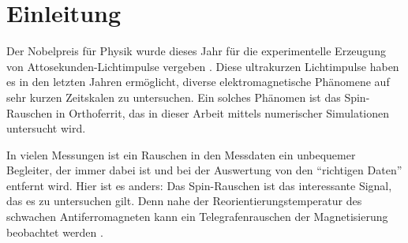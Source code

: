 \documentclass[main.tex]{subfiles}
\begin{document}
\section{Einleitung}

Der Nobelpreis für Physik wurde dieses Jahr für die experimentelle Erzeugung von Attosekunden-Lichtimpulse vergeben \cite{nobel-phy-2023}. Diese ultrakurzen Lichtimpulse haben es in den letzten Jahren ermöglicht, diverse elektromagnetische Phänomene auf sehr kurzen Zeitskalen zu untersuchen. Ein solches Phänomen ist das Spin-Rauschen in Orthoferrit, das in dieser Arbeit mittels numerischer Simulationen untersucht wird.

In vielen Messungen ist ein Rauschen in den Messdaten ein unbequemer Begleiter, der immer dabei ist und bei der Auswertung von den \enquote{richtigen Daten} entfernt wird. Hier ist es anders: Das Spin-Rauschen ist das interessante Signal, das es zu untersuchen gilt. Denn nahe der Reorientierungstemperatur des schwachen Antiferromagneten kann ein Telegrafenrauschen der Magnetisierung beobachtet werden \cite{weiss-ultrafast}.

\end{document}
